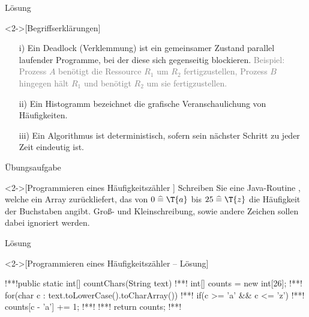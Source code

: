 \begin{frame}[c,fragile]{Lösung}
    \begin{solve}<2->[Begriffserklärungen]
        \begin{enumerate}[<+(1)->]
            \item[i)] Ein Deadlock (Verklemmung) ist ein gemeinsamer Zustand parallel laufender Programme,\pause{} bei der diese sich gegenseitig blockieren.\pause{} \textcolor{gray}{Beispiel:\pause{} Prozess \(A\) benötigt die Ressource \(R_1\) um \(R_2\) fertigzustellen,\pause{} Prozess \(B\) hingegen hält \(R_1\) und benötigt \(R_2\) um sie fertigzustellen.}
            \item[ii)] Ein Histogramm bezeichnet die grafische Veranschaulichung von Häufigkeiten.
            \item[iii)] Ein Algorithmus ist deterministisch, sofern sein nächster Schritt zu jeder Zeit eindeutig ist.
        \end{enumerate}
    \end{solve}
\end{frame}

\begin{frame}[c,fragile]{Übungsaufgabe}
    \begin{exercise}<2->[Programmieren eines Häufigkeitszähler ]
        \pause{}Schreiben Sie eine Java-Routine , welche ein Array  zurückliefert,\pause{} das von \(0 \;\widehat{=}\; \T{a}\)\pause{} bis \(25 \;\widehat{=}\; \T{z}\) die Häufigkeit der Buchstaben angibt.\pause{} Groß- und Kleinschreibung, sowie andere Zeichen sollen dabei ignoriert werden.
    \end{exercise}
\end{frame}

\begin{frame}[c,fragile]{Lösung}
    \begin{solve}<2->[Programmieren eines Häufigkeitszähler -- Lösung]
        \begin{plainjava}
!**!public static int[] countChars(String text){
!**!    int[] counts = new int[26];
!**!    for(char c : text.toLowerCase().toCharArray()){
!**!        if(c >= 'a' && c <= 'z')
!**!            counts[c - 'a'] += 1;
!**!    }
!**!    return counts;
!**!}
        \end{plainjava}
    \end{solve}
\end{frame}


